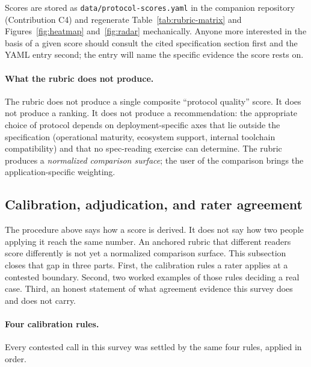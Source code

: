 Scores are stored as \texttt{data/protocol-scores.yaml} in
the companion repository (Contribution C4) and regenerate
Table~\ref{tab:rubric-matrix} and Figures~\ref{fig:heatmap}
and~\ref{fig:radar} mechanically. Anyone more interested
in the basis of a given score should consult the cited
specification section first and the YAML entry second; the
entry will name the specific evidence the score rests on.

\paragraph{What the rubric does not produce.} The rubric
does not produce a single composite ``protocol quality''
score. It does not produce a ranking. It does not produce
a recommendation: the appropriate choice of protocol
depends on deployment-specific axes that lie outside the
specification (operational maturity, ecosystem support,
internal toolchain compatibility) and that no
spec-reading exercise can determine. The rubric produces
a \emph{normalized comparison surface}; the user of the
comparison brings the application-specific weighting.

\subsection{Calibration, adjudication, and rater agreement}
\label{sec:rubric:calibration}

The procedure above says how a score is derived. It does
not say how two people applying it reach the same number.
An anchored rubric that different readers score differently
is not yet a normalized comparison surface. This subsection
closes that gap in three parts. First, the calibration
rules a rater applies at a contested boundary. Second, two
worked examples of those rules deciding a real case. Third,
an honest statement of what agreement evidence this survey
does and does not carry.

\paragraph{Four calibration rules.}
Every contested call in this survey was settled by the same
four rules, applied in order.

